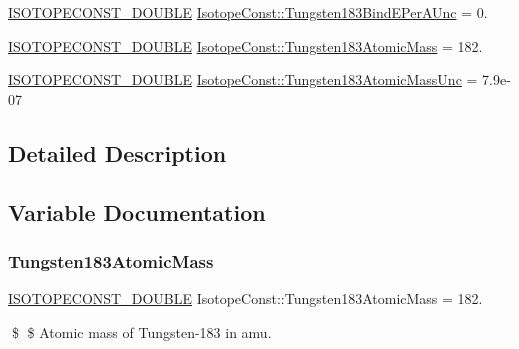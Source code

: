 \begin{DoxyCompactItemize}
\mbox{\hyperlink{group___isotope_const-_macros_ga8f45a7272ce02c0b4c65c44636ed719a}{I\+S\+O\+T\+O\+P\+E\+C\+O\+N\+S\+T\+\_\+\+D\+O\+U\+B\+LE}} \mbox{\hyperlink{group___isotope_const-_tungsten-_w183_ga80416383f46b97e672c0b3d76e2d3276}{Isotope\+Const\+::\+Tungsten183\+Bind\+E\+Per\+A\+Unc}} = 0.
\item 
\mbox{\hyperlink{group___isotope_const-_macros_ga8f45a7272ce02c0b4c65c44636ed719a}{I\+S\+O\+T\+O\+P\+E\+C\+O\+N\+S\+T\+\_\+\+D\+O\+U\+B\+LE}} \mbox{\hyperlink{group___isotope_const-_tungsten-_w183_ga2f37542eb8ad6b8f1f7ea6f872516248}{Isotope\+Const\+::\+Tungsten183\+Atomic\+Mass}} = 182.
\item 
\mbox{\hyperlink{group___isotope_const-_macros_ga8f45a7272ce02c0b4c65c44636ed719a}{I\+S\+O\+T\+O\+P\+E\+C\+O\+N\+S\+T\+\_\+\+D\+O\+U\+B\+LE}} \mbox{\hyperlink{group___isotope_const-_tungsten-_w183_ga2214c6262df668a0a4968d4c86bf9c74}{Isotope\+Const\+::\+Tungsten183\+Atomic\+Mass\+Unc}} = 7.\+9e-\/07
\end{DoxyCompactItemize}


\subsection{Detailed Description}


\subsection{Variable Documentation}
\mbox{\label{group___isotope_const-_tungsten-_w183_ga2f37542eb8ad6b8f1f7ea6f872516248}} 
\subsubsection{\texorpdfstring{Tungsten183\+Atomic\+Mass}{Tungsten183AtomicMass}}
{\footnotesize\ttfamily \mbox{\hyperlink{group___isotope_const-_macros_ga8f45a7272ce02c0b4c65c44636ed719a}{I\+S\+O\+T\+O\+P\+E\+C\+O\+N\+S\+T\+\_\+\+D\+O\+U\+B\+LE}} Isotope\+Const\+::\+Tungsten183\+Atomic\+Mass = 182.}

\$ \$ Atomic mass of Tungsten-\/183 in amu. \mbox{\label{group___isotope_const-_tungsten-_w183_ga2214c6262df668a0a4968d4c86bf9c74}} 
